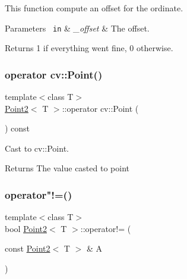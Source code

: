 This function compute an offset for the ordinate. 


\begin{DoxyParams}[1]{Parameters}
\mbox{\texttt{ in}}  & {\em \+\_\+offset} & The offset. \\
\hline
\end{DoxyParams}
\begin{DoxyReturn}{Returns}
1 if everything went fine, 0 otherwise. 
\end{DoxyReturn}
\mbox{\label{class_point2_a0d3f17f7d86d02eae126aa329a20861a}} 
\subsubsection{\texorpdfstring{operator cv::Point()}{operator cv::Point()}}
{\footnotesize\ttfamily template$<$class T$>$ \\
\mbox{\hyperlink{class_point2}{Point2}}$<$ T $>$\+::operator cv\+::\+Point (\begin{DoxyParamCaption}{ }\end{DoxyParamCaption}) const\hspace{0.3cm}{\ttfamily [inline]}}



Cast to cv\+::\+Point. 

\begin{DoxyReturn}{Returns}
The value casted to point 
\end{DoxyReturn}
\mbox{\label{class_point2_ad671e757853f5d7d5431d011d9e94b03}} 
\subsubsection{\texorpdfstring{operator"!=()}{operator!=()}}
{\footnotesize\ttfamily template$<$class T$>$ \\
bool \mbox{\hyperlink{class_point2}{Point2}}$<$ T $>$\+::operator!= (\begin{DoxyParamCaption}\item[{const \mbox{\hyperlink{class_point2}{Point2}}$<$ T $>$ \&}]{A }\end{DoxyParamCaption})\hspace{0.3cm}{\ttfamily [inline]}}



